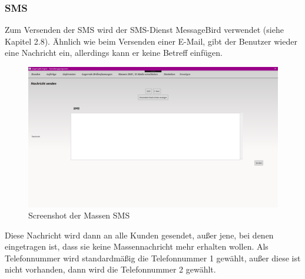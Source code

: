 \subsubsection{SMS}
Zum Versenden der SMS wird der SMS-Dienst MessageBird verwendet (siehe Kapitel 2.8). Ähnlich wie beim Versenden einer E-Mail, gibt der Benutzer wieder eine Nachricht ein, allerdings kann er keine Betreff einfügen.
\begin{figure}[H]
\begin{center}
	\includegraphics[scale=.25]{images/Massensms.png}
\end{center}
	\caption{Screenshot der Massen SMS}
	\label{fig:sample}
\end{figure}
Diese Nachricht wird dann an alle Kunden gesendet, außer jene, bei denen eingetragen ist, dass sie keine Massennachricht mehr erhalten wollen. Als Telefonnummer wird standardmäßig die Telefonnummer 1 gewählt, außer diese ist nicht vorhanden, dann wird die Telefonnummer 2 gewählt. 

